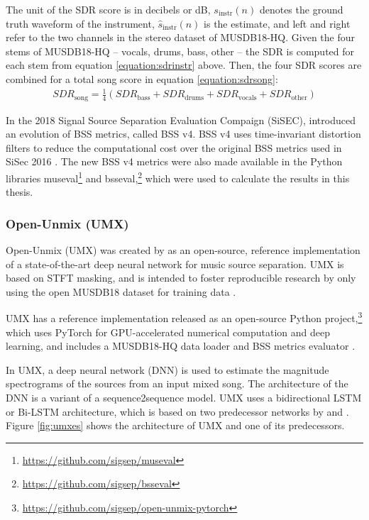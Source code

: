 \documentclass[report.tex]{subfiles}
\begin{document}
The unit of the SDR score is in decibels or dB, $s_{\text{instr}}(n)$ denotes the ground truth waveform of the instrument, $\hat{s}_{\text{instr}}(n)$ is the estimate, and left and right refer to the two channels in the stereo dataset of MUSDB18-HQ. Given the four stems of MUSDB18-HQ -- vocals, drums, bass, other -- the SDR is computed for each stem from equation \eqref{equation:sdrinstr} above. Then, the four SDR scores are combined for a total song score in equation \eqref{equation:sdrsong}:
\begin{align}
	\mathit{SDR}_{\text{song}} = \frac{1}{4}(\mathit{SDR}_{\text{bass}} + \mathit{SDR}_{\text{drums}} + \mathit{SDR}_{\text{vocals}} + \mathit{SDR}_{\text{other}}) \tag{23}\label{equation:sdrsong}
\end{align}

In the 2018 Signal Source Separation Evaluation Compaign (SiSEC), \textcite{sisec2018} introduced an evolution of BSS metrics, called BSS v4. BSS v4 uses time-invariant distortion filters to reduce the computational cost over the original BSS metrics used in SiSec 2016 \parencite{sisec2016}. The new BSS v4 metrics were also made available in the Python libraries museval\footnote{\url{https://github.com/sigsep/museval}} and bsseval,\footnote{\url{https://github.com/sigsep/bsseval}} which were used to calculate the results in this thesis.

\subsubsection{Open-Unmix (UMX)}
\label{sec:umx}

Open-Unmix (UMX) was created by \textcite{umx} as an open-source, reference implementation of a state-of-the-art deep neural network for music source separation. UMX is based on STFT masking, and is intended to foster reproducible research by only using the open MUSDB18 dataset for training data \parencite{musdb18, musdb18hq}.

UMX has a reference implementation released as an open-source Python project,\footnote{\url{https://github.com/sigsep/open-unmix-pytorch}} which uses PyTorch \parencite{pytorch} for GPU-accelerated numerical computation and deep learning, and includes a MUSDB18-HQ data loader \parencite{musdb18hq} and BSS metrics evaluator \parencite{bss}.

In UMX, a deep neural network (DNN) is used to estimate the magnitude spectrograms of the sources from an input mixed song. The architecture of the DNN is a variant of a sequence2sequence model. UMX uses a bidirectional LSTM or Bi-LSTM architecture, which is based on two predecessor networks by \textcite{umxorig1} and \textcite{umxorig2}. Figure \ref{fig:umxes} shows the architecture of UMX and one of its predecessors.
\end{document}
